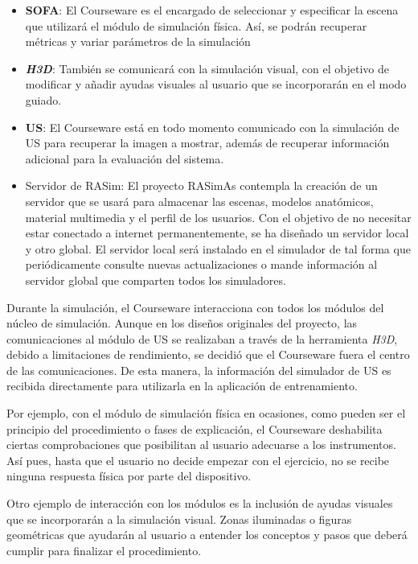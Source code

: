 \begin{itemize}
    \item \textbf{\ac{SOFA}}: El \ac{Courseware} es el encargado de seleccionar y especificar la escena que utilizará el módulo de simulación física. Así, se podrán recuperar métricas y variar parámetros de la simulación
    \item \textbf{\emph{H3D}}: También se comunicará con la simulación visual, con el objetivo de modificar y añadir ayudas visuales al usuario que se incorporarán en el modo guiado.
\item \textbf{\ac{US}}: El \ac{Courseware} está en todo momento comunicado con la simulación de \ac{US} para recuperar la imagen a mostrar, además de recuperar información adicional para la evaluación del sistema.


\item Servidor de RASim: El proyecto \ac{RASimAs} contempla la creación de un servidor que se usará para almacenar las escenas, modelos anatómicos, material multimedia y el perfil de los usuarios. Con el objetivo de no necesitar estar conectado a internet permanentemente, se ha diseñado un servidor local y otro global. El servidor local será instalado en el simulador de tal forma que periódicamente consulte nuevas actualizaciones o mande información al servidor global que comparten todos los simuladores.


\end{itemize}

Durante la simulación, el \ac{Courseware} interacciona con todos los módulos del núcleo de simulación. 
Aunque en los diseños originales del proyecto, las comunicaciones al módulo de \ac{US} se realizaban a través de la herramienta \emph{H3D}, debido a limitaciones de rendimiento, se decidió que el \ac{Courseware} fuera el centro de las comunicaciones. De esta manera, la información del simulador de \ac{US} es recibida directamente para utilizarla en la aplicación de entrenamiento. 

Por ejemplo, con el módulo de simulación física en ocasiones, como pueden ser el principio del procedimiento o fases de explicación, el \ac{Courseware} deshabilita ciertas comprobaciones que posibilitan al usuario adecuarse a los instrumentos. Así pues, hasta que el usuario no decide empezar con el ejercicio, no se recibe ninguna respuesta física por parte del dispositivo. 

Otro ejemplo de interacción con los módulos es la inclusión de ayudas visuales que se incorporarán a la simulación visual. Zonas iluminadas o figuras geométricas que ayudarán al usuario a entender los conceptos y pasos que deberá cumplir para finalizar el procedimiento. 



